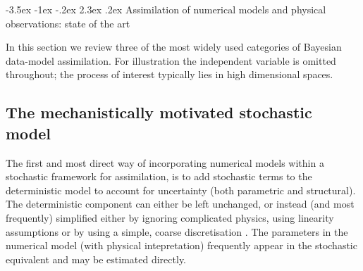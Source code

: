 \documentclass[10pt,a4paper]{article}
\makeatletter
\renewcommand\section{\@startsection{section}{1}{\z@}%
                                  {-3.5ex \@plus -1ex \@minus -.2ex}%
                                  {2.3ex \@plus.2ex}%
                                  {\normalfont\large\bfseries}}
\makeatother
\begin{document}

 


\section{Assimilation of numerical models and physical observations: state of the art}

In this section we review three of the most widely used categories of Bayesian data-model assimilation. For illustration the independent variable is omitted throughout; the process of interest typically lies in high dimensional spaces. 

\subsection{The mechanistically motivated stochastic model}

The first and most direct way of incorporating numerical models within a stochastic framework for assimilation, is to add stochastic terms to the deterministic model to account for uncertainty (both parametric and structural). The deterministic component can either be left unchanged, or instead (and most frequently) simplified either by ignoring complicated physics, using linearity assumptions or by using a simple, coarse discretisation \citep{Berliner_2003}. The parameters in the numerical model (with physical intepretation) frequently appear in the stochastic equivalent and may be estimated directly. 
\end{document}
